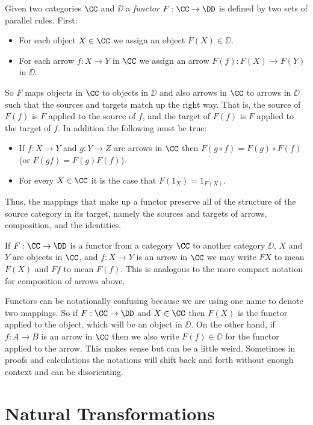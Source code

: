 \goodbreak
\begin{defn}
Given two categories $\CC$ and $\DD$ a {\it functor} $F : \CC \to \DD$ is defined by two
sets of parallel rules. First:
\begin{itemize}
\item For each object $X \in \CC$ we assign an object $F(X) \in \DD$.
\item For each arrow $f: X \to Y$ in $\CC$ we assign an arrow $F(f): F(X) \to F(Y)$ in
$\DD$.
\end{itemize}
\noindent
So $F$ maps objects in $\CC$ to objects in $\DD$ and also arrows in $\CC$ to arrows in
$\DD$ such that the sources and targets match up the right way. That is, the source of
$F(f)$ is $F$ applied to the source of $f$, and the target of $F(f)$ is $F$ applied to
the target of $f$. In addition the following must be true:
\begin{itemize}
\item If $f:X \to Y$ and $g: Y \to Z$ are arrows in $\CC$ then $F(g \circ f) = F(g) \circ
F(f)$ (or $F(gf) = F(g)F(f)$).
\item For every $X \in \CC$ it is the case that $F(1_X) = 1_{F(X)}$.
\end{itemize}

\end{defn}
\noindent
Thus, the mappings that make up a functor preserve all of the structure of the source category
in its target, namely the sources and targets of arrows, composition, and the identities.

If $F: \CC \to \DD$ is a functor from a category $\CC$ to another category $\DD$,
$X$ and $Y$ are objects in $\CC$, and $f: X \to Y$ is an arrow in $\CC$ we may write 
$F X$ to mean $F(X)$ and $Ff$ to mean $F(f)$.
This is analogous to the more compact notation for composition of arrows above.

Functors can be notationally confusing because we are using one name to denote two
mappings. So if $F: \CC \to \DD$ and $X \in \CC$ then $F(X)$ is the functor applied to the
object, which will be an object in $\DD$. On the other hand, if $f : A \to B$ is an arrow
in $\CC$ then we also write $F(f) \in \DD$ for the functor applied to the arrow. This makes
sense but can be a little weird. Sometimes in proofs and calculations the notations will 
shift back and forth without enough context and can be disorienting.

\section{Natural Transformations}

